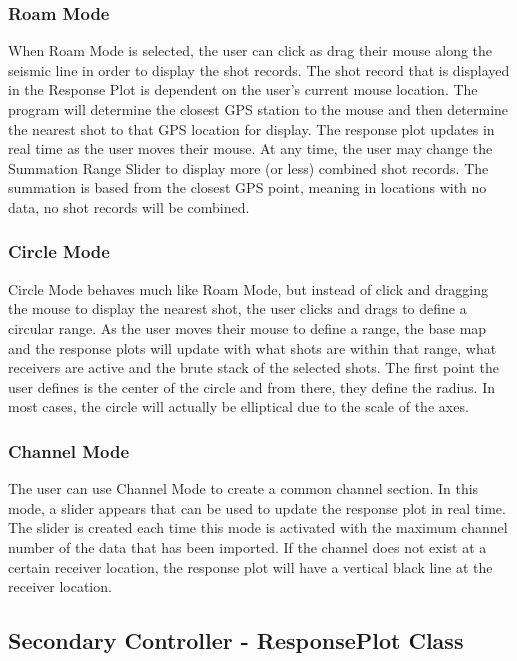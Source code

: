 \documentclass[12pt]{article}
\begin{document}
\subsubsection{Roam Mode}

When Roam Mode is selected, the user can click as drag their mouse along the seismic line in order to display the shot records. The shot record that is displayed in the Response Plot is dependent on the user's current mouse location. The program will determine the closest GPS station to the mouse and then determine the nearest shot to that GPS location for display. The response plot updates in real time as the user moves their mouse. At any time, the user may change the Summation Range Slider to display more (or less) combined shot records. The summation is based from the closest GPS point, meaning in locations with no data, no shot records will be combined.

\subsubsection{Circle Mode}

Circle Mode behaves much like Roam Mode, but instead of click and dragging the mouse to display the nearest shot, the user clicks and drags to define a circular range. As the user moves their mouse to define a range, the base map and the response plots will update with what shots are within that range, what receivers are active and the brute stack of the selected shots. The first point the user defines is the center of the circle and from there, they define the radius. In most cases, the circle will actually be elliptical due to the scale of the axes.

\subsubsection{Channel Mode}

The user can use Channel Mode to create a common channel section. In this mode, a slider appears that can be used to update the response plot in real time. The slider is created each time this mode is activated with the maximum channel number of the data that has been imported. If the channel does not exist at a certain receiver location, the response plot will have a vertical black line at the receiver location.

\subsection{Secondary Controller - ResponsePlot Class}
\end{document}
